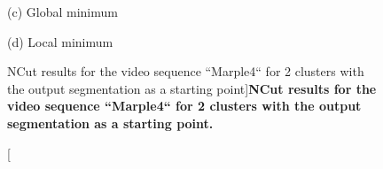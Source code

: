 \begin{figure}[htbp]
\begin{minipage}[t]{0.5\linewidth}
\begin{minipage}[t]{1\textwidth}
\footnotesize (c) Global minimum
\end{minipage}
\begin{minipage}[t]{1\textwidth}
\centering
\hfill \hfill   \hfill 
{} 
\hfill 
{} 
\hfill 
{} 
\hfill 
{} 

\footnotesize (d) Local minimum
\end{minipage}
\end{minipage}
\caption[NCut results for the video sequence ``Marple4`` for 2 clusters with the output segmentation as a starting point]{
{\bf NCut results for the video sequence ``Marple4`` for 2 clusters with the output segmentation as a starting point.}}
\label{fig:NCut_2}
\end{figure}
\newpage

